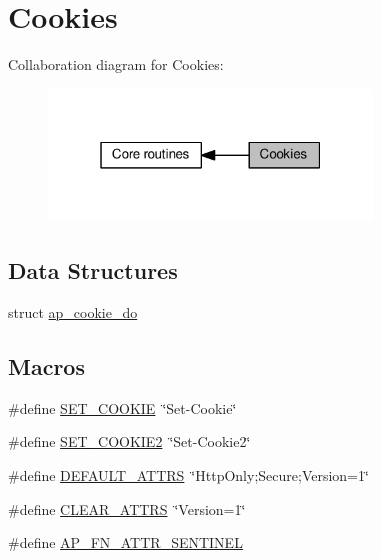 \hypertarget{group__APACHE__CORE__COOKIE}{}\section{Cookies}
\label{group__APACHE__CORE__COOKIE}
Collaboration diagram for Cookies\+:
\nopagebreak
\begin{figure}[H]
\begin{center}
\leavevmode
\includegraphics[width=244pt]{group__APACHE__CORE__COOKIE}
\end{center}
\end{figure}
\subsection*{Data Structures}
\begin{DoxyCompactItemize}
\item 
struct \hyperlink{structap__cookie__do}{ap\+\_\+cookie\+\_\+do}
\end{DoxyCompactItemize}
\subsection*{Macros}
\begin{DoxyCompactItemize}
\item 
\#define \hyperlink{group__APACHE__CORE__COOKIE_ga5fa19bea1553c0dd82e5c88916f51e5b}{S\+E\+T\+\_\+\+C\+O\+O\+K\+IE}~\char`\"{}Set-\/Cookie\char`\"{}
\item 
\#define \hyperlink{group__APACHE__CORE__COOKIE_gad151ac527b6fbcf53a369703220f6f2d}{S\+E\+T\+\_\+\+C\+O\+O\+K\+I\+E2}~\char`\"{}Set-\/Cookie2\char`\"{}
\item 
\#define \hyperlink{group__APACHE__CORE__COOKIE_ga5637644ceca6966eee1ad8be41ebd664}{D\+E\+F\+A\+U\+L\+T\+\_\+\+A\+T\+T\+RS}~\char`\"{}Http\+Only;Secure;Version=1\char`\"{}
\item 
\#define \hyperlink{group__APACHE__CORE__COOKIE_ga5497d3ec4bb5c32dad3217557f6d58c1}{C\+L\+E\+A\+R\+\_\+\+A\+T\+T\+RS}~\char`\"{}Version=1\char`\"{}
\item 
\#define \hyperlink{group__APACHE__CORE__COOKIE_ga2862bb7a008daea7f74384d50f69ef68}{A\+P\+\_\+\+F\+N\+\_\+\+A\+T\+T\+R\+\_\+\+S\+E\+N\+T\+I\+N\+EL}
\end{DoxyCompactItemize}
